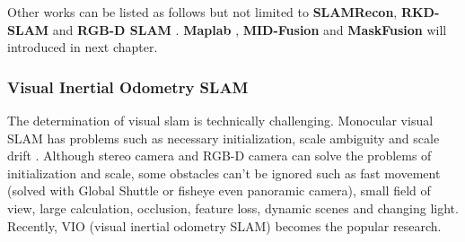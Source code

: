 \documentclass[journal,transmag]{IEEEtran}
\begin{document}
Other works can be listed as follows but not limited to \textbf{SLAMRecon}, \textbf{RKD-SLAM} \cite{liu2017robust} and \textbf{RGB-D SLAM} \cite{dai2018rgb}. \textbf{Maplab} \cite{schneider2018maplab}, \textbf{MID-Fusion}\cite{xu2018mid} and \textbf{MaskFusion} \cite{8613746} will introduced in next chapter. 
\subsubsection{Visual Inertial Odometry SLAM}
The determination of visual slam is technically challenging. Monocular visual SLAM has problems such as necessary initialization, scale ambiguity and scale drift \cite{strasdat2010scale}. Although stereo camera and RGB-D camera can solve the problems of initialization and scale, some obstacles can't be ignored such as fast movement (solved with Global Shuttle or fisheye even panoramic camera), small field of view, large calculation, occlusion, feature loss, dynamic scenes and changing light. Recently, VIO (visual inertial odometry SLAM) becomes the popular research.
\end{document}
